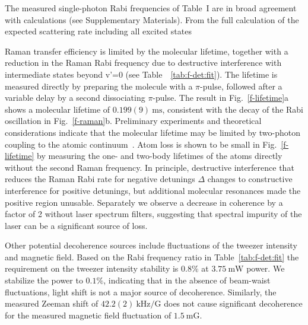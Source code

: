 \documentclass[aps,prl,twocolumn,10pt,superscriptaddress]{revtex4-1}
\newcommand{\todo}[1]{}
\newcounter{TRC}
\newcommand{\TR}[1]{\textcolor{violet}{[[\stepcounter{TRC} TR\arabic{TRC}: #1]]}}
\begin{document}
The measured single-photon Rabi frequencies of Table~I are in broad agreement with calculations (see Supplementary Materials). From the full calculation of the expected scattering rate including all excited states

\todo{change scattering to decoherence? since the fluctuation of light shift
  does not lead to scattering but only decherence.}
Raman transfer efficiency is limited by the molecular lifetime, together with a reduction in the Raman Rabi frequency due to destructive interference with intermediate states beyond v'=0 (see Table~~\ref{tab:f-det:fit}).
The lifetime is measured directly by preparing the molecule with a $\pi$-pulse,
followed after a variable delay by a second dissociating $\pi$-pulse.
The result in Fig.~\ref{f-lifetime}a shows a molecular lifetime of $0.199(9)~\mathrm{ms}$,
consistent with the decay of the Rabi oscillation in Fig.~\ref{f-raman}b.
Preliminary experiments and theoretical considerations indicate that the molecular lifetime may be limited by two-photon coupling to the atomic continuum~\cite{YichaoYu}.  Atom loss is shown to be small in Fig.~\ref{f-lifetime} by measuring the one- and
two-body lifetimes of the atoms directly without the second Raman frequency.  In principle, destructive interference that reduces the Raman Rabi rate for negative detunings $\Delta$ changes to constructive interference for positive detunings, but additional molecular resonances made the positive region unusable.  Separately we observe a decrease in coherence by a factor of 2 without laser spectrum filters,
suggesting that spectral impurity of the laser can be a significant source of loss.

Other potential decoherence sources include
fluctuations of the tweezer intensity and magnetic field.
Based on the Rabi frequency ratio in Table~\ref{tab:f-det:fit}
the requirement on the tweezer intensity stability is $0.8\mathrm{\%}$ at $3.75~\mathrm{mW}$ power. We stabilize the power to $0.1\mathrm{\%}$, indicating that in the absence of beam-waist fluctuations, light shift is not a major source of decoherence.
Similarly, the measured Zeeman shift of $42.2(2)~\mathrm{kHz/G}$
does not cause significant decoherence for the measured magnetic field
fluctuation of $1.5~\mathrm{mG}$.
\end{document}
